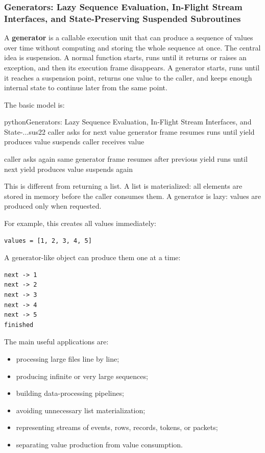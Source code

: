 \subsubsection{Generators: Lazy Sequence Evaluation, In-Flight Stream Interfaces, and State-Preserving Suspended Subroutines}

A \textbf{generator} is a callable execution unit that can produce a sequence of values over time without computing and storing the whole sequence at once. The central idea is suspension. A normal function starts, runs until it returns or raises an exception, and then its execution frame disappears. A generator starts, runs until it reaches a suspension point, returns one value to the caller, and keeps enough internal state to continue later from the same point.

The basic model is:

\begin{codebox}[]{python}{Generators: Lazy Sequence Evaluation, In-Flight Stream Interfaces, and State-...}{sus22}
caller asks for next value
    generator frame resumes
        runs until yield
        produces value
        suspends
caller receives value

caller asks again
    same generator frame resumes after previous yield
        runs until next yield
        produces value
        suspends again
\end{codebox}


This is different from returning a list. A list is materialized: all elements are stored in memory before the caller consumes them. A generator is lazy: values are produced only when requested.

For example, this creates all values immediately:

\begin{verbatim}
values = [1, 2, 3, 4, 5]
\end{verbatim}

A generator-like object can produce them one at a time:

\begin{verbatim}
next -> 1
next -> 2
next -> 3
next -> 4
next -> 5
finished
\end{verbatim}

The main useful applications are:

\begin{itemize}
    \item processing large files line by line;
    \item producing infinite or very large sequences;
    \item building data-processing pipelines;
    \item avoiding unnecessary list materialization;
    \item representing streams of events, rows, records, tokens, or packets;
    \item separating value production from value consumption.
\end{itemize}

